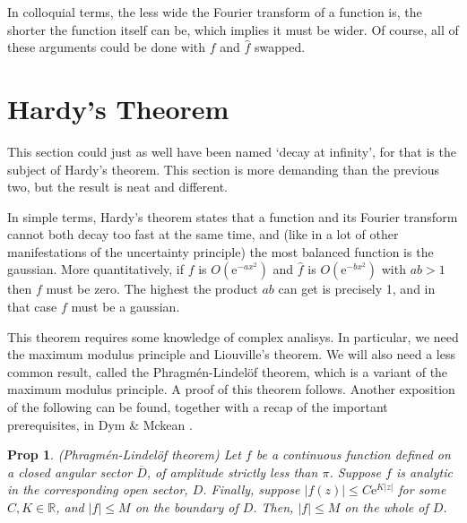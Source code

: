 \documentclass{amsart}
\newcommand{\R}{\mathbb{R}}
\newcommand{\e}{\mathrm{e}}
\newtheorem{prop}{Prop}
\begin{document}
In colloquial terms, the less wide the Fourier transform of a function is, the shorter the function itself can be, which implies it must be wider. Of course, all of these arguments could be done with $f$ and $\hat f$ swapped.

\section{Hardy's Theorem}

This section could just as well have been named `decay at infinity', for that is the subject of Hardy's theorem. This section is more demanding than the previous two, but the result is neat and different.

In simple terms, Hardy's theorem states that a function and its Fourier transform cannot both decay too fast at the same time, and (like in a lot of other manifestations of the uncertainty principle) the most balanced function is the gaussian. More quantitatively, if $f$ is $O(\e^{-a x^2})$ and $\hat f$ is $O(\e^{-b x^2})$ with $ab > 1$ then $f$ must be zero. The highest the product $ab$ can get is precisely 1, and in that case $f$ must be a gaussian.

This theorem requires some knowledge of complex analisys. In particular, we need the maximum modulus principle and Liouville's theorem. We will also need a less common result, called the Phragmén-Lindelöf theorem, which is a variant of the maximum modulus principle. A proof of this theorem follows. Another exposition of the following can be found, together with a recap of the important prerequisites, in Dym \& Mckean \cite{dmk}.

\begin{prop}
(Phragmén-Lindelöf theorem) Let $f$ be a continuous function defined on a closed angular sector $\overline D$, of amplitude strictly less than $\pi$. Suppose $f$ is analytic in the corresponding open sector, $D$. Finally, suppose $\lvert f(z) \rvert \leq C \e^{K \lvert z \rvert}$ for some $C, K \in \R$, and $\lvert f \rvert \leq M$ on the boundary of $D$. Then, $\lvert f \rvert \leq M$ on the whole of $D$.
\end{prop}
\end{document}
